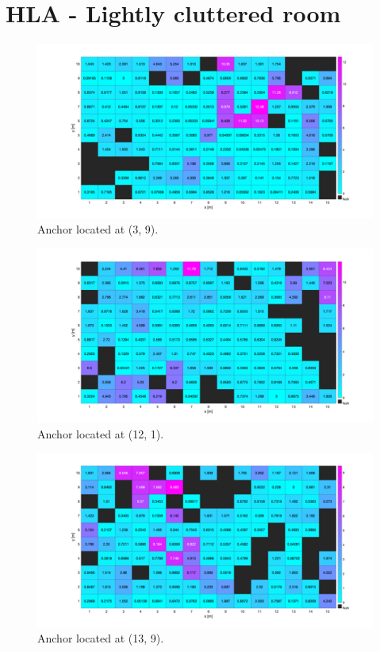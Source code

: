\chapter{HLA - Lightly cluttered room}

\begin{figure}[H]
\centering
\includegraphics[width=.9\linewidth]{Images/hla_images/hla_anchor_(3_9)_clut.png}
\caption{Anchor located at (3, 9).}
\end{figure}

\begin{figure}[H]
\centering
\includegraphics[width=.9\linewidth]{Images/hla_images/hla_anchor_(12_1)_clut.png}
\caption{Anchor located at (12, 1).}
\end{figure}

\begin{figure}[H]
\centering
\includegraphics[width=.9\linewidth]{Images/hla_images/hla_anchor_(13_9)_clut.png}
\caption{Anchor located at (13, 9).}
\end{figure}


